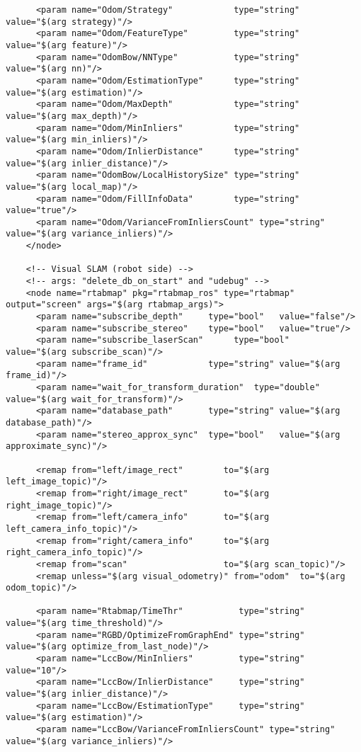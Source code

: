 \begin{center}
\begin{footnotesize}
\begin{verbatim}
      <param name="Odom/Strategy"            type="string" value="$(arg strategy)"/> 
      <param name="Odom/FeatureType"         type="string" value="$(arg feature)"/>  
      <param name="OdomBow/NNType"           type="string" value="$(arg nn)"/>
      <param name="Odom/EstimationType"      type="string" value="$(arg estimation)"/> 
      <param name="Odom/MaxDepth"            type="string" value="$(arg max_depth)"/>  
      <param name="Odom/MinInliers"          type="string" value="$(arg min_inliers)"/> 
      <param name="Odom/InlierDistance"      type="string" value="$(arg inlier_distance)"/>       
      <param name="OdomBow/LocalHistorySize" type="string" value="$(arg local_map)"/> 
      <param name="Odom/FillInfoData"        type="string" value="true"/>   
      <param name="Odom/VarianceFromInliersCount" type="string" value="$(arg variance_inliers)"/>
    </node>
  
    <!-- Visual SLAM (robot side) -->
    <!-- args: "delete_db_on_start" and "udebug" -->
    <node name="rtabmap" pkg="rtabmap_ros" type="rtabmap" output="screen" args="$(arg rtabmap_args)">
      <param name="subscribe_depth"     type="bool"   value="false"/>
      <param name="subscribe_stereo"    type="bool"   value="true"/>
      <param name="subscribe_laserScan"      type="bool"   value="$(arg subscribe_scan)"/>
      <param name="frame_id"            type="string" value="$(arg frame_id)"/>
      <param name="wait_for_transform_duration"  type="double"   value="$(arg wait_for_transform)"/>
      <param name="database_path"       type="string" value="$(arg database_path)"/>
      <param name="stereo_approx_sync"  type="bool"   value="$(arg approximate_sync)"/>
	
      <remap from="left/image_rect"        to="$(arg left_image_topic)"/>
      <remap from="right/image_rect"       to="$(arg right_image_topic)"/>
      <remap from="left/camera_info"       to="$(arg left_camera_info_topic)"/>
      <remap from="right/camera_info"      to="$(arg right_camera_info_topic)"/>
      <remap from="scan"                   to="$(arg scan_topic)"/>
      <remap unless="$(arg visual_odometry)" from="odom"  to="$(arg odom_topic)"/>
      
      <param name="Rtabmap/TimeThr"           type="string" value="$(arg time_threshold)"/>
      <param name="RGBD/OptimizeFromGraphEnd" type="string" value="$(arg optimize_from_last_node)"/>
      <param name="LccBow/MinInliers"         type="string" value="10"/>
      <param name="LccBow/InlierDistance"     type="string" value="$(arg inlier_distance)"/>
      <param name="LccBow/EstimationType"     type="string" value="$(arg estimation)"/> 
      <param name="LccBow/VarianceFromInliersCount" type="string" value="$(arg variance_inliers)"/>


\end{verbatim}
\end{footnotesize}
\end{center}
